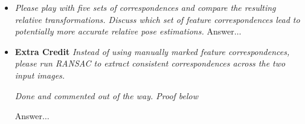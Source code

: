\documentclass[11pt]{article}
\begin{document}
\begin{itemize}
        \item \textit{Please play with five sets of correspondences and compare the resulting relative
        transformations. Discuss which set of feature correspondences lead to potentially more accurate relative pose
        estimations.}\newline
        Answer$\ldots$\newline

        \item \textbf{Extra Credit} \textit{Instead of using manually marked feature correspondences, please run
        RANSAC to extract consistent correspondences across the two input images.}
        \par
        \textit{\textemdash Done and commented out of the way. Proof below}
        \par
        Answer$\ldots$\newline
    \end{itemize}
\end{document}
